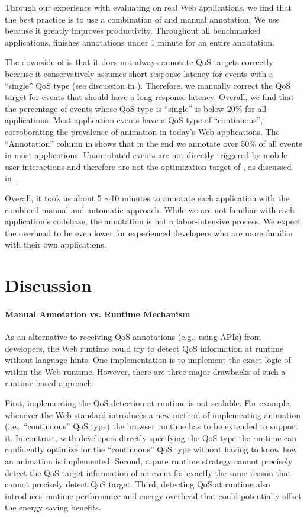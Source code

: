Through our experience with evaluating \greenweb on real Web applications, we find that the best practice is to use a combination of \autogreen and manual annotation. We use \autogreen because it greatly improves productivity. Throughout all benchmarked applications, \autogreen finishes annotations under 1 minute for an entire annotation.

The downside of \autogreen is that it does not always annotate QoS targets correctly because it conservatively assumes short response latency for events with a ``single'' QoS type (see discussion in ). Therefore, we manually correct the QoS target for events that should have a long response latency. Overall, we find that the percentage of events whose QoS type is ``single'' is below 20\% for all applications. Most application events have a QoS type of ``continuous'', corroborating the prevalence of animation in today's Web applications. The ``Annotation'' column in  shows that in the end we annotate over 50\% of all events in most applications. Unannotated events are not directly triggered by mobile user interactions and therefore are not the optimization target of \greenweb, as discussed in~.

Overall, it took us about 5 $\sim$10 minutes to annotate each application with the combined manual and automatic approach. While we are not familiar with each application's codebase, the annotation is not a labor-intensive process. We expect the overhead to be even lower for experienced developers who are more familiar with their own applications.

\section{Discussion}
\label{sec:lang:disc}

\paragraph{Manual Annotation vs. Runtime Mechanism} As an alternative to receiving QoS annotations (e.g., using \greenweb APIs) from developers, the Web runtime could try to detect QoS information at runtime without language hints. One implementation is to implement the exact logic of \autogreen within the Web runtime. However, there are three major drawbacks of such a runtime-based approach.

First, implementing the QoS detection at runtime is not scalable. For example, whenever the Web standard introduces a new method of implementing animation (i.e., ``continuous'' QoS type) the browser runtime has to be extended to support it. In contrast, with developers directly specifying the QoS type the runtime can confidently optimize for the ``continuous'' QoS type without having to know how an animation is implemented. Second, a pure runtime strategy cannot precisely detect the QoS target information of an event for exactly the same reason that \autogreen cannot precisely detect QoS target. Third, detecting QoS at runtime also introduces runtime performance and energy overhead that could potentially offset the energy saving benefits.

